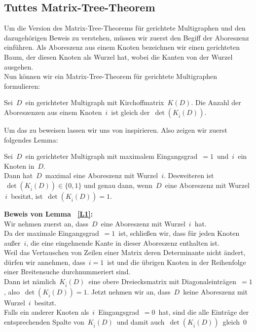 \subsection{Tuttes Matrix-Tree-Theorem}
Um die Version des Matrix-Tree-Theorems für gerichtete Multigraphen und den dazugehörigen Beweis zu verstehen, müssen wir zuerst den Begiff der Aboreszenz einführen.
Als Aboreszenz aus einem Knoten bezeichnen wir einen gerichteten Baum, der diesen Knoten als Wurzel hat, wobei die Kanten von der Wurzel ausgehen.\\
Nun können wir ein Matrix-Tree-Theorem für gerichtete Multigraphen formulieren:
\begin{Tms}
\sloppypar
Sei $\,D\,$ ein gerichteter Multigraph mit Kirchoffmatrix $\,K(D)$.\;  Die Anzahl der Aboreszenzen aus einem Knoten $\,i\,$ ist gleich der $\,\det(K_{\bar{i}}(D))$.\; 
\par
\end{Tms}
Um das zu beweisen lassen wir uns von \cite{bang-jensen_2009} inspirieren.
Also zeigen wir zuerst folgendes Lemma:
\begin{Lms}
Sei $\,D\,$ ein gerichteter Multigraph mit maximalem Eingangsgrad $\,=1\,$ und $\,i\,$ ein Knoten in $\,D$.\; \\
Dann hat $\,D\,$ maximal eine Aboreszenz mit Wurzel $\,i$.\;  Desweiteren ist $\,\det(K_{\bar{i}}(D)) \in \{0,1\}$
und genau dann, wenn $\,D\,$ eine Aboreszenz mit Wurzel $\,i\,$ besitzt, ist $\,\det(K_{\bar{i}}(D)) = 1$.\; 
\label{L1}
\end{Lms}
\textbf{Beweis von Lemma ~\ref{L1}:}\\
Wir nehmen zuerst an, dass $\,D\,$ eine Aboreszenz mit Wurzel $\,i\,$ hat.\\
Da der maximale Eingangsgrad $\,=1\,$ ist, schließen wir, dass für jeden Knoten außer $\,i$,\; die eine eingehnende Kante in dieser Aboreszenz enthalten ist. \\
Weil das Vertauschen von Zeilen einer Matrix deren Determinante nicht ändert, dürfen wir annehmen, dass $\,i=1\,$ ist und die übrigen Knoten in der Reihenfolge einer Breitensuche durchnummeriert sind.\\ 
Dann ist nämlich $\,K_{\bar{i}}(D)\,$ eine obere Dreiecksmatrix mit Diagonaleinträgen $\,=1$,\; also $\,\det(K_{\bar{i}}(D)) = 1$.\; 
Jetzt nehmen wir an, dass $\,D\,$ keine Aboreszenz mit Wurzel $\,i\,$ besitzt.\\
Falls ein anderer Knoten als $\,i\,$ Eingangsgrad $\,=0\,$ hat, sind die alle Einträge der entsprechenden Spalte von $\,K_{\bar{i}}(D)\,$ und damit auch $\,\det(K_{\bar{i}}(D))\,$ gleich $\,0$\\
